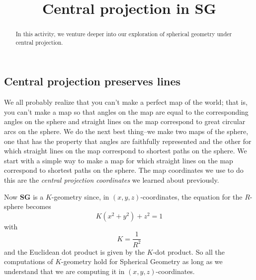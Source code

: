 \documentclass{ximera}
\title{Central projection in \textbf{SG}}
\begin{document}
\begin{abstract}
In this activity, we venture deeper into our exploration of spherical
geometry under central projection.
\end{abstract}
\maketitle

\subsection*{Central projection preserves lines}

We all probably realize that you can't make a perfect map of the world; that
is, you can't make a map so that angles on the map are equal to the
corresponding angles on the sphere and straight lines on the map correspond to
great circular arcs on the sphere. We do the next best thing--we make two maps
of the sphere, one that has the property that angles are faithfully
represented and the other for which straight lines on the map correspond to
shortest paths on the sphere. We start with a simple way to make a map for
which straight lines on the map correspond to shortest paths on the sphere.
The map coordinates we use to do this are the \textit{central projection
coordinates} we learned about previously.%

Now \textbf{SG} is a $K$-geometry %
since, in
$\left(  x,y,z\right)  $-coordinates, the equation for the $R$-sphere becomes%
\[
K\left(  x^{2}+y^{2}\right)  +z^{2}=1
\]
with%
\[
K=\frac{1}{R^{2}}%
\]
and the Euclidean dot product is given by the $K$-dot product. So all
the computations of $K$-geometry hold for Spherical Geometry as long
as we understand that we are computing it in $\left( x,y,z\right)
$-coordinates.
\end{document}
